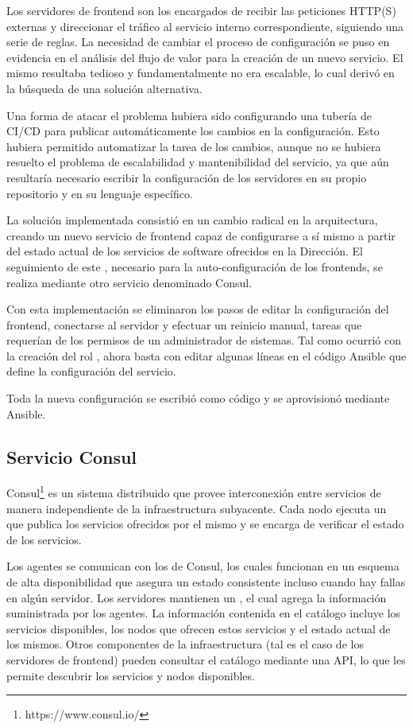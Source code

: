 Los servidores de frontend son los encargados de recibir las
peticiones HTTP(S) externas y direccionar el tráfico al servicio
interno correspondiente, siguiendo una serie de reglas. La necesidad
de cambiar el proceso de configuración se puso en evidencia en el
análisis del flujo de valor para la creación de un nuevo servicio. El
mismo resultaba tedioso y fundamentalmente no era escalable, lo cual
derivó en la búsqueda de una solución alternativa.

Una forma de atacar el problema hubiera sido configurando una tubería
de CI/CD para publicar automáticamente los cambios en la
configuración. Esto hubiera permitido automatizar la tarea de
 los cambios, aunque no se hubiera resuelto el
problema de escalabilidad y mantenibilidad del servicio, ya que aún
resultaría necesario escribir la configuración de los servidores en su
propio repositorio y en su lenguaje específico.

La solución implementada consistió en un cambio radical en la
arquitectura, creando un nuevo servicio de frontend capaz de
configurarse a sí mismo a partir del estado actual de los servicios de
software ofrecidos en la Dirección. El seguimiento de este
, necesario para la auto-configuración de los
frontends, se realiza mediante otro servicio denominado Consul.

Con esta implementación se eliminaron los pasos de editar la
configuración del frontend, conectarse al servidor y efectuar un
reinicio manual, tareas que requerían de los permisos de un
administrador de sistemas. Tal como ocurrió con la creación del rol
, ahora basta con editar algunas líneas en el código
Ansible que define la configuración del servicio.

Toda la nueva configuración se escribió como código y se aprovisionó
mediante Ansible.

\subsection{Servicio Consul}

Consul\footnote{ https://www.consul.io/} es un sistema distribuido que
provee interconexión entre servicios de manera independiente de la
infraestructura subyacente. Cada nodo ejecuta un  que
publica los servicios ofrecidos por el mismo y se encarga de verificar
el estado de los servicios.

Los agentes se comunican con los  de Consul, los
cuales funcionan en un esquema de alta disponibilidad que asegura un
estado consistente incluso cuando hay fallas en algún servidor. Los
servidores mantienen un , el cual agrega la
información suministrada por los agentes. La información contenida en
el catálogo incluye los servicios disponibles, los nodos que ofrecen
estos servicios y el estado actual de los mismos. Otros componentes de
la infraestructura (tal es el caso de los servidores de frontend)
pueden consultar el catálogo mediante una API, lo que les permite
descubrir los servicios y nodos disponibles.

